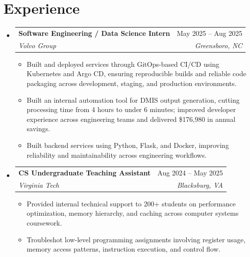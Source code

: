 \documentclass[letterpaper,11pt]{article}
\makeatletter
\newcommand{\resumeItem}[1]{
  \item\small{
    {#1 \vspace{-2pt}}
  }
}
\newcommand{\resumeSubheading}[4]{
  \vspace{-2pt}\item
    \begin{tabular*}{0.97\textwidth}[t]{l@{\extracolsep{\fill}}r}
      \textbf{#1} & #2 \\
      \textit{\small#3} & \textit{\small #4} \\
    \end{tabular*}\vspace{-7pt}
}
\newcommand{\resumeSubHeadingListStart}{\begin{itemize}[leftmargin=0.15in, label={}]}
\newcommand{\resumeSubHeadingListEnd}{\end{itemize}}
\newcommand{\resumeItemListStart}{\begin{itemize}}
\newcommand{\resumeItemListEnd}{\end{itemize}\vspace{-5pt}}
\makeatother
\begin{document}
\section{Experience}
  \resumeSubHeadingListStart
    \resumeSubheading
      {Software Engineering / Data Science Intern}{May 2025 -- Aug 2025}
      {Volvo Group}{Greensboro, NC}
      \resumeItemListStart
        \resumeItem{Built and deployed services through GitOps-based CI/CD using Kubernetes and Argo CD, ensuring reproducible builds and reliable code packaging across development, staging, and production environments.}
        \resumeItem{Built an internal automation tool for DMIS output generation, cutting processing time from 4 hours to under 6 minutes; improved developer experience across engineering teams and delivered \$176,980 in annual savings.}
        \resumeItem{Built backend services using Python, Flask, and Docker, improving reliability and maintainability across engineering workflows.}
      \resumeItemListEnd
    \resumeSubheading
      {CS Undergraduate Teaching Assistant}{Aug 2024 -- May 2025}
      {Virginia Tech}{Blacksburg, VA}
      \resumeItemListStart
        \resumeItem{Provided internal technical support to 200+ students on performance optimization, memory hierarchy, and caching across computer systems coursework.}
        \resumeItem{Troubleshot low-level programming assignments involving register usage, memory access patterns, instruction execution, and control flow.}
      \resumeItemListEnd
  \resumeSubHeadingListEnd
\end{document}
